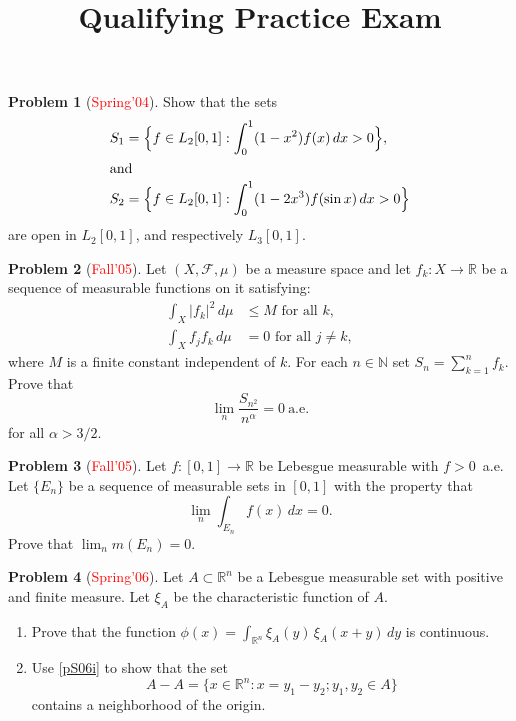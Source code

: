 \documentclass[12pt]{amsart}
\def\field#1{\mathbb{#1}}
\def\abs#1{\lvert {#1} \rvert}
\theoremstyle{definition}
\newtheorem{problem}{Problem}
\theoremstyle{remark}
\begin{document}
\title{Qualifying Practice Exam}
\maketitle

\begin{problem}[\textcolor{red}{Spring'04}]
  Show that the sets
  \begin{align*}
    S_1 &= \Big\{ f \in L_2[0,1] : \int_0^1 (1-x^2) f(x)\, dx >0
    \Big\}, \\
    \intertext{and} S_2 &= \Big\{ f \in L_2[0,1] : \int_0^1 (1-2x^3)
    f(\sin x)\, dx > 0 \Big\}
  \end{align*}
  are open in $L_2[0,1]$, and respectively $L_3[0,1]$.
\end{problem}
\begin{problem}[\textcolor{red}{Fall'05}]
  Let $(X, \mathcal{F}, \mu)$ be a measure space and let $f_k\colon X
  \to \field{R}$ be a sequence of measurable functions on it
  satisfying:
  \begin{align*}
    \int_X \abs{f_k}^2\, d\mu &\leq M \text{ for all }k,\\
    \int_X f_j f_k\, d\mu &=0 \text{ for all } j\neq k,
  \end{align*}
  where $M$ is a finite constant independent of $k$.  For each $n \in
  \field{N}$ set $S_n = \sum_{k=1}^n f_k$.  Prove that
  \begin{equation*}
    \lim_n \frac{S_{n^2}}{n^\alpha} = 0~\text{a.e.}
  \end{equation*}
  for all $\alpha > 3/2$.
\end{problem}
\begin{problem}[\textcolor{red}{Fall'05}]
  Let $f\colon [0,1] \to \field{R}$ be Lebesgue measurable with $f >
  0$~a.e. Let $\{ E_n \}$ be a sequence of measurable sets in $[0,1]$
  with the property that
  \begin{equation*}
    \lim_n \int_{E_n} f(x)\, dx = 0.
  \end{equation*}
  Prove that $\lim_n m(E_n) = 0$.
\end{problem}
\begin{problem}[\textcolor{red}{Spring'06}]
  Let $A \subset \field{R}^n$ be a Lebesgue measurable set with
  positive and finite measure.  Let $\xi_A$ be the characteristic
  function of $A$.
  \begin{enumerate}
  \item \label{pS06i} Prove that the function $\phi(x) = \int_{\field{R}^n}
  \xi_A(y)\, \xi_A (x+y)\, dy$ is continuous.
  \item Use \ref{pS06i} to show that the set
    \begin{equation*}
      A - A = \{ x \in \field{R}^n : x=y_1 - y_2; y_1,y_2 \in A \}
    \end{equation*}
    contains a neighborhood of the origin.
  \end{enumerate}
\end{problem}
\end{document}

